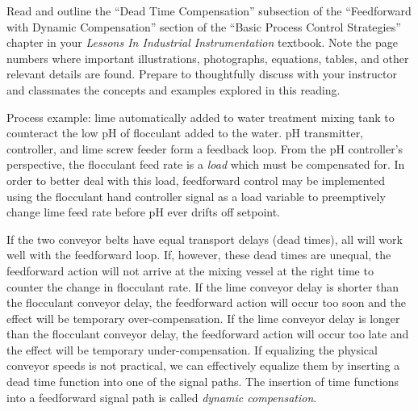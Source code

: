 

Read and outline the ``Dead Time Compensation'' subsection of the ``Feedforward with Dynamic Compensation'' section of the ``Basic Process Control Strategies'' chapter in your {\it Lessons In Industrial Instrumentation} textbook.  Note the page numbers where important illustrations, photographs, equations, tables, and other relevant details are found.  Prepare to thoughtfully discuss with your instructor and classmates the concepts and examples explored in this reading.














Process example: lime automatically added to water treatment mixing tank to counteract the low pH of flocculant added to the water.  pH transmitter, controller, and lime screw feeder form a feedback loop.  From the pH controller's perspective, the flocculant feed rate is a {\it load} which must be compensated for.  In order to better deal with this load, feedforward control may be implemented using the flocculant hand controller signal as a load variable to preemptively change lime feed rate before pH ever drifts off setpoint.

\vskip 10pt

If the two conveyor belts have equal transport delays (dead times), all will work well with the feedforward loop.  If, however, these dead times are unequal, the feedforward action will not arrive at the mixing vessel at the right time to counter the change in flocculant rate.  If the lime conveyor delay is shorter than the flocculant conveyor delay, the feedforward action will occur too soon and the effect will be temporary over-compensation.  If the lime conveyor delay is longer than the flocculant conveyor delay, the feedforward action will occur too late and the effect will be temporary under-compensation.  If equalizing the physical conveyor speeds is not practical, we can effectively equalize them by inserting a dead time function into one of the signal paths.  The insertion of time functions into a feedforward signal path is called {\it dynamic compensation}.

